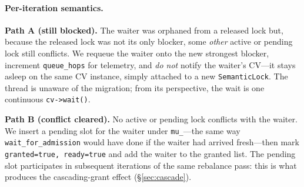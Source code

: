 \documentclass[sigconf]{acmart}
\begin{document}



\paragraph{Per-iteration semantics.}
\textbf{Path A (still blocked).} The waiter was orphaned from a
released lock but, because the released lock was not its only blocker,
some \emph{other} active or pending lock still conflicts. We requeue
the waiter onto the new strongest blocker, increment \texttt{queue\_hops}
for telemetry, and \emph{do not} notify the waiter's CV---it stays
asleep on the same CV instance, simply attached to a new
\texttt{SemanticLock}. The thread is unaware of the migration; from its
perspective, the wait is one continuous \texttt{cv->wait()}.

\textbf{Path B (conflict cleared).} No active or pending lock conflicts
with the waiter. We insert a pending slot for the waiter under
\texttt{mu\_}---the same way \texttt{wait\_for\_admission} would have
done if the waiter had arrived fresh---then mark \texttt{granted=true,
ready=true} and add the waiter to the granted list. The pending slot
participates in subsequent iterations of the same rebalance pass: this
is what produces the cascading-grant effect (\S\ref{sec:cascade}).
\end{document}
